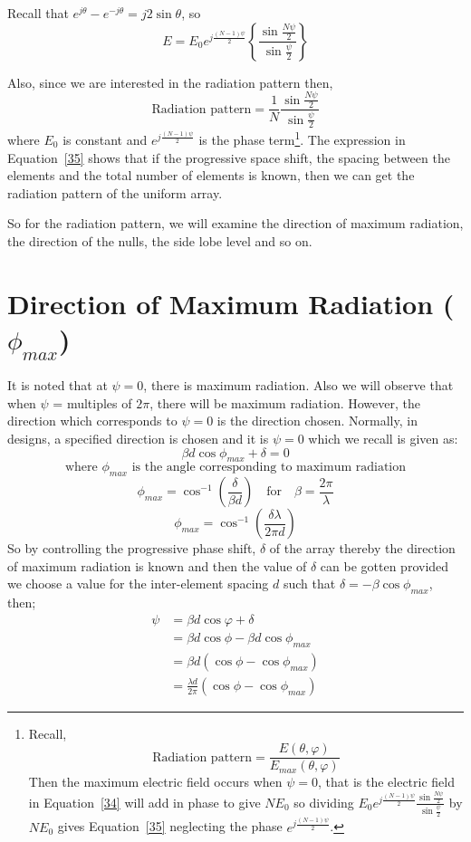 Recall that $e^{j\theta} - e^{-j\theta} = j2\sin\theta$, so
$$
E = E_0e^{j\frac{(N-1)\psi}{2}} \left\{\frac{\sin{\frac{N\psi}{2}}}{\sin{\frac{\psi}{2}}}\right\}
$$

Also, since we are interested in the radiation pattern then, 
\begin{equation}
\label{35}
\text{Radiation pattern} = \frac{1}{N} \frac{\sin{\frac{N\psi}{2}}}{\sin{\frac{\psi}{2}}}
\end{equation}
where $E_0$ is constant and $e^{j\frac{(N-1)\psi}{2}}$ is the phase term\footnote{Recall, 
$$
\text{Radiation pattern} = \frac{E(\theta, \varphi)}{E_{max}(\theta, \varphi)}
$$
Then the maximum electric field occurs when $\psi = 0$, that is the electric field in Equation~\ref{34} will add in phase to give $NE_0$ so dividing $E_0e^{j\frac{(N-1)\psi}{2}} \frac{\sin{\frac{N\psi}{2}}}{\sin{\frac{\psi}{2}}}$ by  $NE_0$ gives Equation~\ref{35} neglecting the phase $e^{j\frac{(N-1)\psi}{2}}$.
}.
The expression in Equation~\ref{35} shows that if the progressive space shift, the spacing between the elements and the total number of elements is known, then we can get the radiation pattern of the uniform array. 

So for the radiation pattern, we will examine the direction of maximum radiation, the direction of the nulls, the side lobe level and so on.

\section{Direction of Maximum Radiation ($\phi_{max}$)}
It is noted that at $\psi = 0$, there is maximum radiation. Also we will observe that when $\psi$ = multiples of $2\pi$, there will be maximum radiation. However, the direction which corresponds to $\psi = 0$ is the direction chosen. Normally, in designs, a specified direction is chosen and it is $\psi = 0$ which we recall is given as:
$$
\beta d\cos {\phi_{max}} + \delta = 0 
$$
$$
\text{where $\phi_{max}$ is the angle corresponding to maximum radiation}
$$
$$\phi_{max} = \cos^{-1}{(\frac{\delta}{\beta d})} \quad \text{for} \quad \beta = \frac{2\pi}{\lambda} $$
$$\phi_{max} = \cos^{-1}{(\frac{\delta \lambda}{2\pi d})}  $$
So by controlling the progressive phase shift, $\delta$ of the array thereby the direction of maximum radiation is known and then the value of $\delta$ can be gotten provided we choose a value for the inter-element spacing $d$ such that $\delta = -\beta \cos{\phi_{max}}$, then;
\begin{align}
\psi &=\beta d \cos {\varphi} + \delta \\
&=\beta d \cos{\phi} - \beta d \cos{\phi_{max}} \\
\label{36}
&=\beta d (\cos{\phi} - \cos{\phi_{max}}) \\
&=\frac{\lambda d}{2\pi}(\cos{\phi} - \cos{\phi_{max}})
\end{align}


